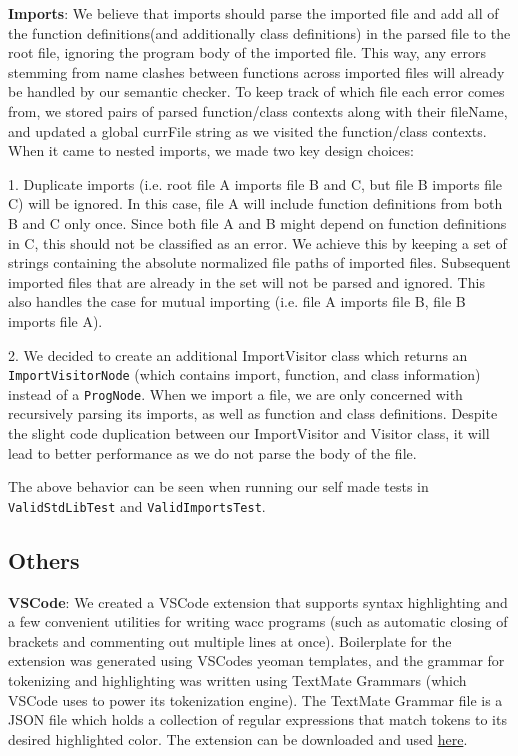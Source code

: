 \documentclass[11pt,a4paper]{article}
\newcommand{\cmd}[1]{\texttt{#1}}
\begin{document}
\noindent \textbf{Imports}: We believe that imports should parse the imported file and add all of the function definitions(and additionally class definitions) in the parsed file to the root file, ignoring the program body of the imported file. This way, any errors stemming from name clashes between functions across imported files will already be handled by our semantic checker. To keep track of which file each error comes from, we stored pairs of parsed function/class contexts along with their fileName, and updated a global currFile string as we visited the function/class contexts. When it came to nested imports, we made two key design choices:

1. Duplicate imports (i.e. root file A imports file B and C, but file B imports file C) will be ignored. In this case, file A will include function definitions from both B and C only once. Since both file A and B might depend on function definitions in C, this should not be classified as an error. We achieve this by keeping a set of strings containing the absolute normalized file paths of imported files. Subsequent imported files that are already in the set will not be parsed and ignored. This also handles the case for mutual importing (i.e. file A imports file B, file B imports file A). 

2. We decided to create an additional ImportVisitor class which returns an \cmd{ImportVisitorNode} (which contains import, function, and class information) instead of a \cmd{ProgNode}. When we import a file, we are only concerned with recursively parsing its imports, as well as function and class definitions. Despite the slight code duplication between our ImportVisitor and Visitor class, it will lead to better performance as we do not parse the body of the file. 

The above behavior can be seen when running our self made tests in \cmd{ValidStdLibTest} and \cmd{ValidImportsTest}.

\subsection{Others}
\noindent \textbf{VSCode}: We created a VSCode extension that supports syntax highlighting and a few convenient utilities for writing wacc programs (such as automatic closing of brackets and commenting out multiple lines at once). Boilerplate for the extension was generated using VSCodes yeoman templates, and the grammar for tokenizing and highlighting was written using TextMate Grammars (which VSCode uses to power its tokenization engine). The TextMate Grammar file is a JSON file which holds a collection of regular expressions that match tokens to its desired highlighted color. The extension can be downloaded and used 
\href{https://marketplace.visualstudio.com/items?itemName=2021-wacc-22.wacc-language}{here}.
\end{document}

